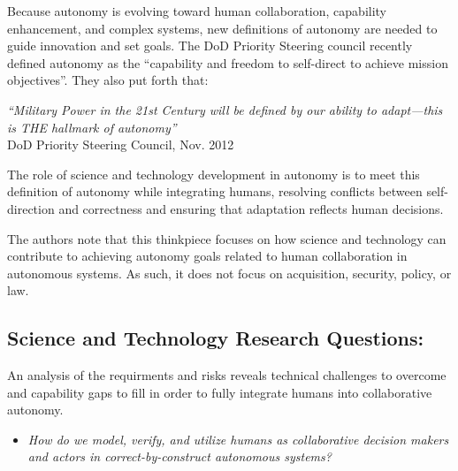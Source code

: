 
Because autonomy is evolving toward human collaboration, capability enhancement, and complex systems, 
new definitions of autonomy are needed to guide innovation and set goals.  The DoD Priority Steering
council recently defined autonomy as the ``capability and freedom to self-direct to achieve mission objectives''.
They also put forth that:
\begin{center}
\parbox[c]{6in}{
{\em ``Military Power in the 21st Century will be defined by our ability to adapt---this is THE hallmark of autonomy''
} \\
 \hspace*{20pt} DoD Priority Steering Council, Nov. 2012
}
\end{center}
The role of science and technology development in autonomy is to meet this definition of autonomy
while integrating humans, resolving conflicts between self-direction and correctness and 
ensuring that adaptation reflects human decisions.

The authors note that this thinkpiece focuses on how science and technology can contribute to achieving autonomy goals related to human collaboration in autonomous systems.
As such, it does not focus on acquisition, security, policy, or law.

\subsection*{Science and Technology Research Questions:}

An analysis of the requirments and risks reveals technical challenges to overcome and capability gaps to fill in order to
fully integrate humans into collaborative autonomy.  


\begin{itemize}
\item {\em How do we model, verify, and utilize humans as collaborative decision makers and actors in correct-by-construct autonomous systems?}
\end{itemize}

